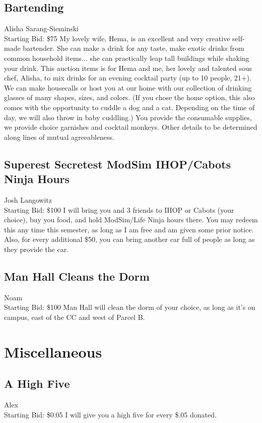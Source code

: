 \documentclass[11pt]{article}
\begin{document}
\subsection{Bartending}
Alisha Sarang-Sieminski
\\
Starting Bid: \$75
\newline
My lovely wife, Hema, is an excellent and very creative self-made bartender. She can make a drink for any taste, make exotic drinks from common household items... she can practically leap tall buildings while shaking your drink. This auction items is for Hema and me, her lovely and talented sous chef, Alisha, to mix drinks for an evening cocktail party (up to 10 people, 21+). We can make housecalls or host you at our home with our collection of drinking glasses of many shapes, sizes, and colors. (If you chose the home option, this also comes with the opportunity to cuddle a dog and a cat. Depending on the time of day, we will also throw in baby cuddling.) You provide the consumable supplies, we provide choice garnishes and cocktail monkeys. Other details to be determined along lines of mutual agreeableness.
\subsection{Superest Secretest ModSim IHOP/Cabots Ninja Hours}
Josh Langowitz
\\
Starting Bid: \$100
\newline
I will bring you and 3 friends to IHOP or Cabots (your choice), buy you food, and hold ModSim/Life Ninja hours there. You may redeem this any time this semester, as long as I am free and am given some prior notice. Also, for every additional \$50, you can bring another car full of people as long as they provide the car.
\subsection{Man Hall Cleans the Dorm}
Noam
\\
Starting Bid: \$100
\newline
Man Hall will clean the dorm of your choice, as long as it's on campus,  east of the CC and west of Parcel B.
\section{Miscellaneous}
\subsection{A High Five}
Alex
\\
Starting Bid: \$0.05
\newline
I will give you a high five for every \$.05 donated.
\end{document}
